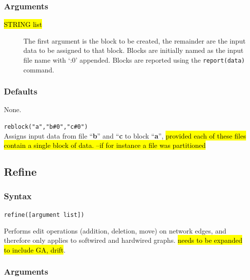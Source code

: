 	\subsubsection{Arguments}
	\begin{description}
		\item [\hl{STRING list}] The first argument is the block to be created, the remainder 
		are the input data to be assigned to that block. Blocks are initially named as the input 
		file name with `:0' appended. Blocks are reported using the \texttt{report(data)} command.
	\end{description}

	\subsubsection{Defaults}
		None.
	
	\begin{example}

		\item{\texttt{reblock("a","b\#0","c\#0")}\\ Assigns input data from file ``\textbf{b}'' and 
		``\textbf{c} to block ``\textbf{a}'', \hl{provided each of these files contain a single block 
		of data. --if for instance a file was partitioned}}
	
	\end{example}

\subsection{Refine}
\label{subsec:refine}
	\subsubsection{Syntax}
		\texttt{refine([argument list])}
		
	\begin{phygdescription}
		{Performs edit operations (addition, deletion, move) on network edges, and 
		therefore only applies to softwired and hardwired graphs. \hl{needs to be expanded 
		to include GA, drift}}.
	\end{phygdescription}

	\subsubsection{Arguments}
		
